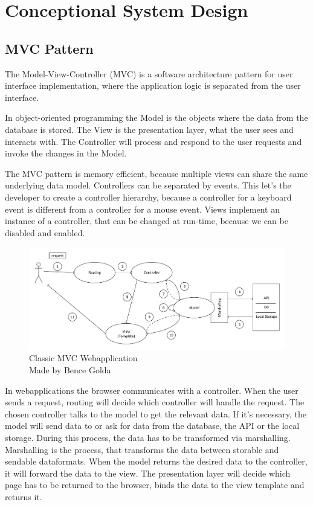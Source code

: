 \chapter{Conceptional System Design}


\section{MVC Pattern}
\label{mvc}

The Model-View-Controller (MVC) is a software architecture pattern for user interface implementation, where the application logic is separated from the user interface.

In object-oriented programming the Model is the objects where the data from the database is stored. The View is the presentation layer, what the user sees and interacts with. The Controller will process and respond to the user requests and invoke the changes in the Model. 

The MVC pattern is memory efficient, because multiple views can share the same underlying data model. Controllers can be separated by events. This let's the developer to create a controller hierarchy, because a controller for a keyboard event is different from a controller for a mouse event. Views implement an instance of a controller, that can be changed at run-time, because we can be disabled and enabled.


\begin{figure}[!ht]
	\includegraphics[width=\textwidth]{figures/klasszikus_mvc_webalkalmazas.pdf}
	\caption{Classic MVC Webapplication \\ Made by Bence Golda}
	\label{fig:classic-mvc-webapplication}
\end{figure}

In webapplications the browser communicates with a controller. When the user sends a request, routing will decide which controller will handle the request. The chosen controller talks to the model to get the relevant data. If it's necessary, the model will send data to or ask for data from the database, the API or the local storage. During this process, the data has to be transformed via marshalling. Marshalling is the process, that transforms the data between storable and sendable dataformats. When the model returns the desired data to the controller, it will forward the data to the view. The presentation layer will decide which page has to be returned to the browser, binds the data to the view template and returns it.

